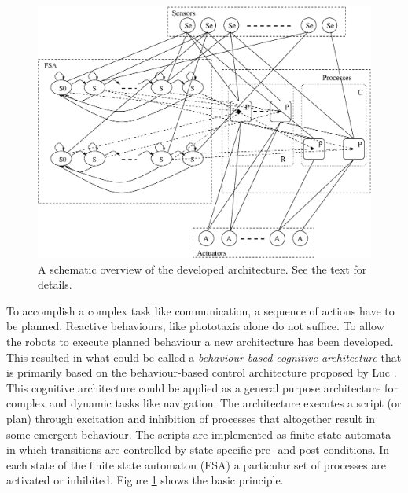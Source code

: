 
\begin{figure}[t]
\centerline{\includegraphics[width=12cm]{lang_games//fsa.eps}}
\caption{A schematic overview of the developed architecture. See the text for details.}
\label{f:architscheme}
\end{figure}

To accomplish a complex task like communication, a sequence of actions have to be planned. Reactive behaviours, like phototaxis alone do not suffice. To allow the robots to execute planned behaviour a new architecture has been developed. This resulted in what could be called a {\em behaviour-based cognitive architecture} that is primarily based on the behaviour-based control architecture proposed by Luc \citet{steels:1994b}. This cognitive architecture could be applied as a general purpose architecture for complex and dynamic tasks like navigation. The architecture executes a script (or plan) through excitation and inhibition of processes that altogether result in some emergent behaviour. The scripts are implemented as finite state automata in which transitions are controlled by state-specific pre- and post-conditions. In each state of the finite state automaton (FSA) a particular set of processes are activated or inhibited. Figure \ref{f:architscheme} shows the basic principle.

